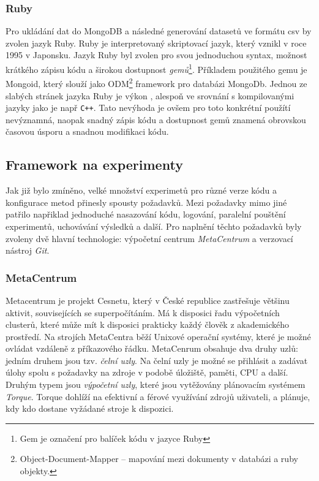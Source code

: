 \documentclass[thesis=M,czech]{FITthesis}[2012/06/26]
\begin{document}
\subsubsection*{Ruby}
Pro ukládání dat do MongoDB a následné generování datasetů ve formátu csv by zvolen jazyk Ruby. Ruby je interpretovaný skriptovací jazyk, který vznikl v roce 1995 v Japonsku.
Jazyk Ruby byl zvolen pro svou jednoduchou syntax, možnost krátkého zápisu kódu a širokou dostupnost \textit{gemů}\footnote{Gem je označení pro balíček kódu v jazyce Ruby}. Příkladem použitého gemu je Mongoid, který slouží jako ODM\footnote{Object-Document-Mapper -- mapování mezi dokumenty v databázi a ruby objekty.} framework pro databázi MongoDb.
Jednou ze slabých stránek jazyka Ruby je výkon \cite{ruby_performance}, alespoň ve srovnání s kompilovanými jazyky jako je např \texttt{C++}. Tato nevýhoda je ovšem pro toto konkrétní použítí nevýznamná, naopak snadný zápis kódu a dostupnost gemů znamená obrovskou časovou úsporu a snadnou modifikaci kódu.


\subsection{Framework na experimenty}
Jak již bylo zmíněno, velké množství experimetů pro různé verze kódu a konfigurace metod přinesly spousty požadavků. Mezi požadavky mimo jiné patřilo napřiklad jednoduché nasazování kódu, logování, paralelní pouštění experimentů, uchovávání výsledků a další. Pro naplnění těchto požadavků byly zvoleny dvě hlavní technologie: výpočetní centrum \textit{MetaCentrum} a verzovací nástroj \textit{Git}.


\subsubsection*{MetaCentrum}
Metacentrum je projekt Cesnetu, který v České republice zastřešuje většinu aktivit, souvisejících se superpočítáním. Má k disposici řadu výpočetních clusterů, které může mít k disposici prakticky každý člověk z akademického prostředí.
Na strojích MetaCentra běží Unixové operační systémy, které je možné ovládat vzdáleně z příkazového řádku. MetaCenrum obsahuje dva druhy uzlů: jedním druhem jsou tzv. \textit{čelní uzly}.
Na čelní uzly je možné se přihlásit a zadávat úlohy spolu s požadavky na zdroje v podobě úložiště, paměti, CPU a další.
Druhým typem jsou \textit{výpočetní uzly}, které jsou vytěžovány plánovacím systémem \textit{Torque}. Torque dohlíží na efektivní a férové využívání zdrojů uživateli, a plánuje, kdy kdo dostane vyžádané stroje k dispozici. \cite{metacentrum}
\end{document}
